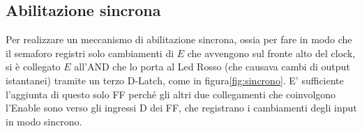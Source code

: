 \documentclass[10pt,a4paper]{article}
\begin{document}

\subsection{Abilitazione sincrona}
Per realizzare un meccanismo di abilitazione sincrona, ossia per fare in modo che il semaforo registri solo cambiamenti di $E$ che avvengono sul fronte alto del clock, si è collegato $E$ all'AND che lo porta al Led Rosso (che causava cambi di output istantanei) tramite un terzo D-Latch, come in figura\ref{fig:sincrono}.
E' sufficiente l'aggiunta di questo solo FF perché gli altri due collegamenti che coinvolgono l'Enable sono verso gli ingressi D dei FF, che registrano i cambiamenti degli input in modo sincrono.


\end{document}
